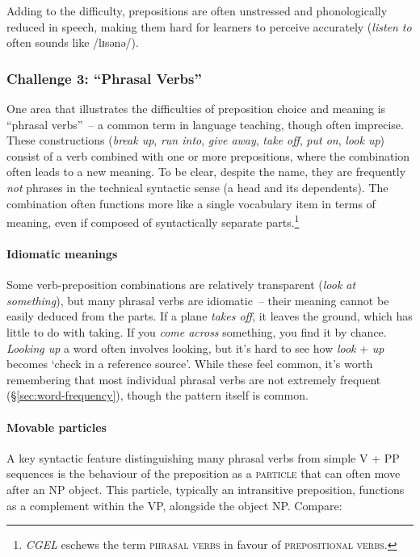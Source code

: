 Adding to the difficulty, prepositions are often unstressed and phonologically reduced in speech, making them hard for learners to perceive accurately (\textit{listen to} often sounds like /lɪsənə/).

\subsubsection*{Challenge 3: ``Phrasal Verbs''}\label{sec:phrasal-verbs-challenge}

One area that illustrates the difficulties of preposition choice and meaning is ``phrasal verbs''~-- a common term in language teaching, though often imprecise. These constructions (\textit{break up}, \textit{run into}, \textit{give away}, \textit{take off}, \textit{put on}, \textit{look up}) consist of a verb combined with one or more prepositions, where the combination often leads to a new meaning. To be clear, despite the name, they are frequently \emph{not} phrases in the technical syntactic sense (a head and its dependents). The combination often functions more like a single vocabulary item in terms of meaning, even if composed of syntactically separate parts.\footnote{\textit{CGEL} \autocite{Huddleston2002} eschews the term \textsc{phrasal verbs} in favour of \textsc{prepositional verbs}.}

\paragraph*{Idiomatic meanings}
Some verb-preposition combinations are relatively transparent (\textit{look at something}), but many phrasal verbs are idiomatic~-- their meaning cannot be easily deduced from the parts. If a plane \textit{takes off}, it leaves the ground, which has little to do with taking. If you \textit{come across} something, you find it by chance. \textit{Looking up} a word often involves looking, but it's hard to see how \textit{look} + \textit{up} becomes `check in a reference source'. While these feel common, it's worth remembering that most individual phrasal verbs are not extremely frequent (\S\ref{sec:word-frequency}), though the pattern itself is common.

\paragraph*{Movable particles}
A key syntactic feature distinguishing many phrasal verbs from simple V + PP sequences is the behaviour of the preposition as a \textsc{particle} that can often move after an NP object. This particle, typically an intransitive preposition, functions as a complement within the VP, alongside the object NP. Compare:

